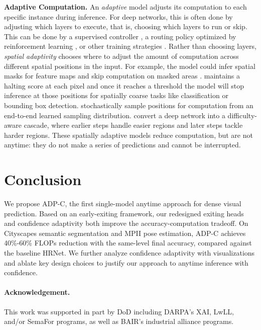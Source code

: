 \documentclass{article} %
\renewcommand{\cite}{\citep}
\begin{document}
\textbf{Adaptive Computation.}
An \emph{adaptive} model adjusts its computation to each specific instance during inference.
For deep networks, this is often done by adjusting which layers to execute, that is, choosing which layers to run or skip.
This can be done by a supervised controller \cite{veit2018convolutional,liu2017dynamic}, a routing policy optimized by reinforcement learning \cite{wang2018skipnet,Wu2018BlockDropDI,lin2017runtime}, or other training strategies \cite{mcgill2017deciding}.
Rather than choosing layers, \emph{spatial adaptivity} chooses where to adjust the amount of computation across different spatial positions in the input.
For example, the model could infer spatial masks for feature maps and skip computation on masked areas \cite{pred0_0, pred0_1,pred0_3,pred0_4,pred0_5}.
\citet{figurnov2017spatially} maintains a halting score at each pixel and once it reaches a threshold the model will stop inference at those positions for spatially coarse tasks like classification or bounding box detection.
\citet{xie2020spatially} stochastically sample positions for computation from an end-to-end learned sampling distribution. 
\citet{li2017not} convert a deep network into a difficulty-aware cascade, where earlier steps handle easier regions and later steps tackle harder regions.
These spatially adaptive models reduce computation, but are not anytime: they do not make a series of predictions and cannot be interrupted.


\section{Conclusion}
We propose ADP-C, the first single-model anytime approach for dense visual prediction.
Based on an early-exiting framework, our redesigned exiting heads and confidence adaptivity both improve the accuracy-computation tradeoff.
On Cityscapes semantic segmentation and MPII pose estimation, ADP-C achieves 40\%-60\% FLOPs reduction with the same-level final accuracy, compared against the baseline HRNet.
We further analyze confidence adaptivity with visualizations and ablate key design choices to justify our approach to anytime inference with confidence.

\paragraph{Acknowledgement.} This work was supported in part by DoD including DARPA's XAI, LwLL, and/or SemaFor programs, as well as BAIR's industrial alliance programs.






\clearpage
\appendix

\end{document}
